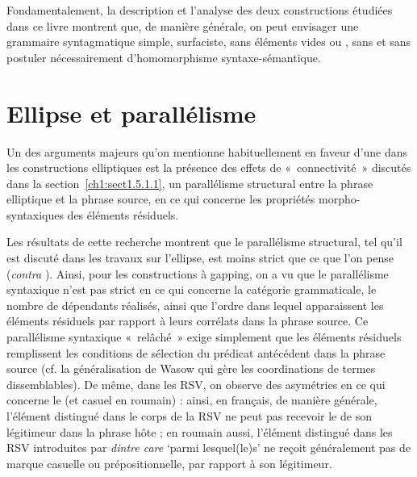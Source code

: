 Fondamentalement, la description et l’analyse des deux constructions étudiées dans ce livre montrent que, de manière générale, on peut envisager une grammaire syntagmatique simple, surfaciste, sans éléments vides ou , sans  et sans postuler nécessairement d’homomorphisme syntaxe-séman\-tique.

\section{Ellipse et parallélisme}\label{concl:sect2}

Un des arguments majeurs qu’on mentionne habituellement en faveur d’une  dans les constructions elliptiques est la présence des effets de «~connectivité~» discutés dans la section~\ref{ch1:sect1.5.1.1}, {\cad} un parallélisme structural entre la phrase elliptique et la phrase source, en ce qui concerne les propriétés morpho-syntaxiques des éléments résiduels. 

\newpage 
Les résultats de cette recherche montrent que le parallélisme structural, tel qu’il est discuté dans les travaux sur l’ellipse, est moins strict que ce que l’on pense (\textit{contra} \citealt{CulicoverEtAl2005}). Ainsi, pour les constructions à gapping, on a vu que le parallélisme syntaxique n’est pas strict en ce qui concerne la catégorie grammaticale, le nombre de dépendants réalisés, ainsi que l’ordre dans lequel apparaissent les éléments résiduels par rapport à leurs corrélats dans la phrase source. Ce parallélisme syntaxique «~relâché~» exige simplement que les éléments résiduels remplissent les conditions de sélection du prédicat antécédent dans la phrase source (cf. la généralisation de Wasow qui gère les coordinations de termes dissemblables). De même, dans les RSV, on observe des asymétries en ce qui concerne le  (et casuel en roumain) : ainsi, en français, de manière générale, l’élément distingué dans le corps de la RSV ne peut pas recevoir le  de son légitimeur dans la phrase hôte ; en roumain aussi, l’élément distingué dans les RSV introduites par \textit{dintre care} ‘parmi lesquel(le)s’ ne reçoit généralement pas de marque casuelle ou prépositionnelle, par rapport à son légitimeur.

